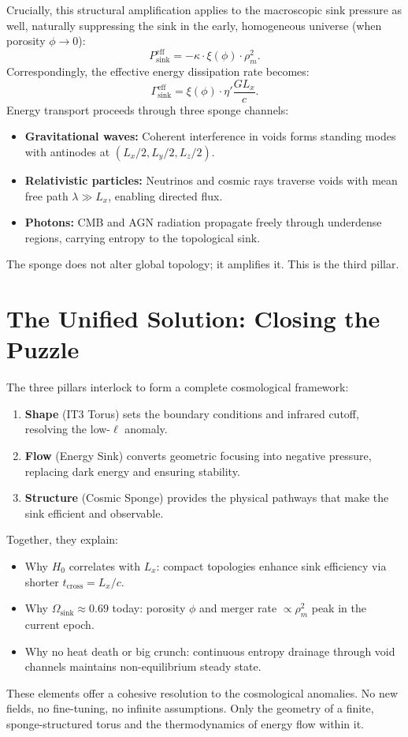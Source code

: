 \documentclass[12pt,a4paper]{article}
\begin{document}
Crucially, this structural amplification applies to the macroscopic sink pressure as well, naturally suppressing the sink in the early, homogeneous universe (when porosity $\phi \to 0$):
\begin{equation}
P_{\text{sink}}^{\text{eff}} = -\kappa \cdot \xi(\phi) \cdot \rho_m^2.
\end{equation}
Correspondingly, the effective energy dissipation rate becomes:
\begin{equation}
\Gamma_{\text{sink}}^{\text{eff}} = \xi(\phi) \cdot \eta' \frac{G L_x}{c}.
\end{equation}
Energy transport proceeds through three sponge channels:
\begin{itemize}
    \item \textbf{Gravitational waves:} Coherent interference in voids forms standing modes with antinodes at $(L_x/2, L_y/2, L_z/2)$.
    \item \textbf{Relativistic particles:} Neutrinos and cosmic rays traverse voids with mean free path $\lambda \gg L_x$, enabling directed flux.
    \item \textbf{Photons:} CMB and AGN radiation propagate freely through underdense regions, carrying entropy to the topological sink.
\end{itemize}
The sponge does not alter global topology; it amplifies it. This is the third pillar.

\section{The Unified Solution: Closing the Puzzle}

The three pillars interlock to form a complete cosmological framework:
\begin{enumerate}
    \item \textbf{Shape} (IT3 Torus) sets the boundary conditions and infrared cutoff, resolving the low-$\ell$ anomaly.
    \item \textbf{Flow} (Energy Sink) converts geometric focusing into negative pressure, replacing dark energy and ensuring stability.
    \item \textbf{Structure} (Cosmic Sponge) provides the physical pathways that make the sink efficient and observable.
\end{enumerate}
Together, they explain:
\begin{itemize}
    \item Why $H_0$ correlates with $L_x$: compact topologies enhance sink efficiency via shorter $t_{\text{cross}} = L_x/c$.
    \item Why $\Omega_{\text{sink}} \approx 0.69$ today: porosity $\phi$ and merger rate $\propto \rho_m^2$ peak in the current epoch.
    \item Why no heat death or big crunch: continuous entropy drainage through void channels maintains non-equilibrium steady state.
\end{itemize}
These elements offer a cohesive resolution to the cosmological anomalies. No new fields, no fine-tuning, no infinite assumptions. Only the geometry of a finite, sponge-structured torus and the thermodynamics of energy flow within it.
\end{document}
